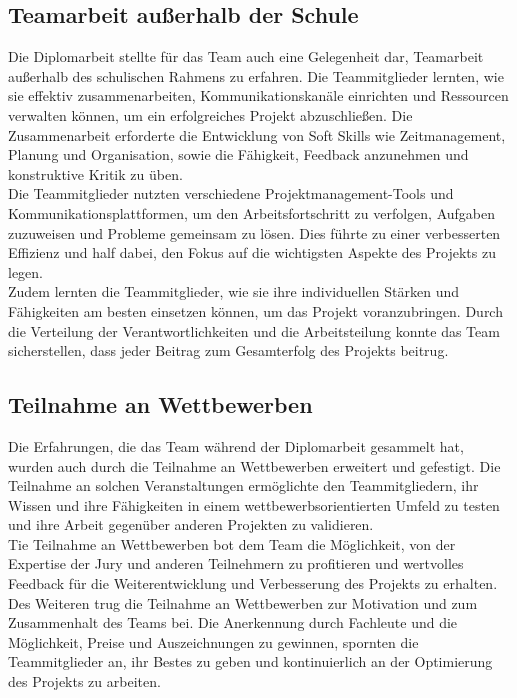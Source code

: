 \subsection{Teamarbeit außerhalb der Schule}

Die Diplomarbeit stellte für das Team auch eine Gelegenheit dar, Teamarbeit außerhalb des schulischen Rahmens zu erfahren. Die Teammitglieder lernten, wie sie effektiv zusammenarbeiten, Kommunikationskanäle einrichten und Ressourcen verwalten können, um ein erfolgreiches Projekt abzuschließen. Die Zusammenarbeit erforderte die Entwicklung von Soft Skills wie Zeitmanagement, Planung und Organisation, sowie die Fähigkeit, Feedback anzunehmen und konstruktive Kritik zu üben.
\\
Die Teammitglieder nutzten verschiedene Projektmanagement-Tools und Kommunikationsplattformen, um den Arbeitsfortschritt zu verfolgen, Aufgaben zuzuweisen und Probleme gemeinsam zu lösen. Dies führte zu einer verbesserten Effizienz und half dabei, den Fokus auf die wichtigsten Aspekte des Projekts zu legen.
\\
Zudem lernten die Teammitglieder, wie sie ihre individuellen Stärken und Fähigkeiten am besten einsetzen können, um das Projekt voranzubringen. Durch die Verteilung der Verantwortlichkeiten und die Arbeitsteilung konnte das Team sicherstellen, dass jeder Beitrag zum Gesamterfolg des Projekts beitrug.

\subsection{Teilnahme an Wettbewerben}

Die Erfahrungen, die das Team während der Diplomarbeit gesammelt hat, wurden auch durch die Teilnahme an Wettbewerben erweitert und gefestigt. Die Teilnahme an solchen Veranstaltungen ermöglichte den Teammitgliedern, ihr Wissen und ihre Fähigkeiten in einem wettbewerbsorientierten Umfeld zu testen und ihre Arbeit gegenüber anderen Projekten zu validieren.
\\
Tie Teilnahme an Wettbewerben bot dem Team die Möglichkeit, von der Expertise der Jury und anderen Teilnehmern zu profitieren und wertvolles Feedback für die Weiterentwicklung und Verbesserung des Projekts zu erhalten.
\\
Des Weiteren trug die Teilnahme an Wettbewerben zur Motivation und zum Zusammenhalt des Teams bei. Die Anerkennung durch Fachleute und die Möglichkeit, Preise und Auszeichnungen zu gewinnen, spornten die Teammitglieder an, ihr Bestes zu geben und kontinuierlich an der Optimierung des Projekts zu arbeiten.
